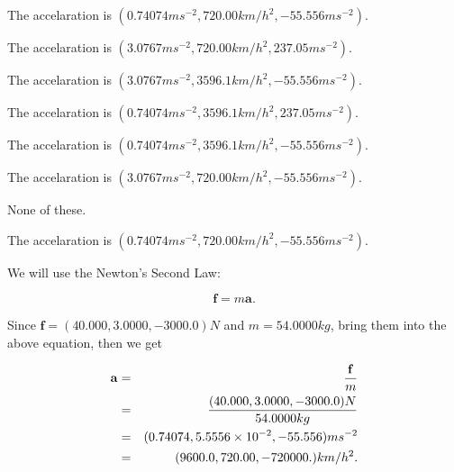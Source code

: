\documentclass[12pt]{article}
\begin{document}
 
 
The accelaration is
$(
0.74074ms^{-2},
720.00km/h^2,
-55.556ms^{-2}
).
$
 
 
The accelaration is
$(
3.0767ms^{-2},
720.00km/h^2,
237.05ms^{-2}
).
$
 
 
The accelaration is
$(
3.0767ms^{-2},
3596.1km/h^2,
-55.556ms^{-2}
).
$
 
 
The accelaration is
$(
0.74074ms^{-2},
3596.1km/h^2,
237.05ms^{-2}
).
$
 
 
The accelaration is
$(
0.74074ms^{-2},
3596.1km/h^2,
-55.556ms^{-2}
).
$
 
 
The accelaration is
$(
3.0767ms^{-2},
720.00km/h^2,
-55.556ms^{-2}
).
$
 
 
 None of these.
 
 
\noindent{}
 
 
The accelaration is
$(
0.74074ms^{-2},
720.00km/h^2,
-55.556ms^{-2}
).
$
 
 
\noindent{}
 
 
 
 
 
 
\noindent{}
 
 

We will use the Newton's Second Law:
 
\[
\mathbf{f}=m\mathbf{a}.
\]
 
Since $\mathbf{f}=( %
40.000,  %
3.0000,  %
-3000.0 )N$
and $m= %
54.0000kg$, bring them into the above equation, then we get
 
\begin{eqnarray*}
\mathbf{a}&=&\frac{\mathbf{f}}m  \\
&=&\frac{(
40.000 ,
3.0000 ,
-3000.0 )N
}{ %
54.0000 kg}  \\
&=&(
0.74074 ,
5.5556 \times 10^{-2},
-55.556
)ms^{-2} \\
&=&(
9600.0 ,
720.00 ,
-720000.
)km/h^2.
\end{eqnarray*}
 
 
 
\noindent{}
 
\end{document}
